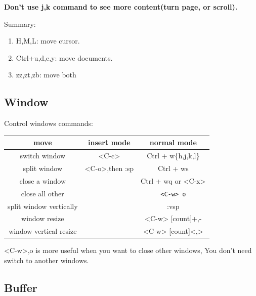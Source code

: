 \documentclass[paper=8.5in:11in, twoside, 12pt, pagesize=pdftex]{book}
\begin{document}
		\textbf{Don't use j,k command to see more content(turn page, or scroll).}
		
		Summary:
		\begin{enumerate}
			\item H,M,L: move cursor.
			
			\item Ctrl+u,d,e,y: move documents.
			\item zz,zt,zb: move both
		\end{enumerate}
	
\subsection{Window}

Control windows commands:
		
		\begin{center}
			\begin{tabular}{c|c|c}
				\hline
				move & insert mode & normal mode \\
				
				\hline 
				switch window & <C-c> &  Ctrl + w\{h,j,k,l\}\\
				
				\hline 
				split window & <C-o>,then :sp  &  Ctrl + ws\\
				
				\hline 
				close a window & & Ctrl + wq or <C-x>\\
				
				\hline 
				close all other & & \texttt{<C-w> o} \\
				
				\hline
				split window vertically	&   & :vsp \\ 
				
				
				\hline
				window resize	& &  <C-w> [count]+,- \\ 
				
				\hline
				window vertical resize	& &  <C-w> [count]<,> \\ 
				
				\hline 
			\end{tabular}
		\end{center}
		
		 <C-w>,o is more useful when you want to close other windows, You don't need switch to another windows.

	
\subsection{Buffer}
\end{document}
